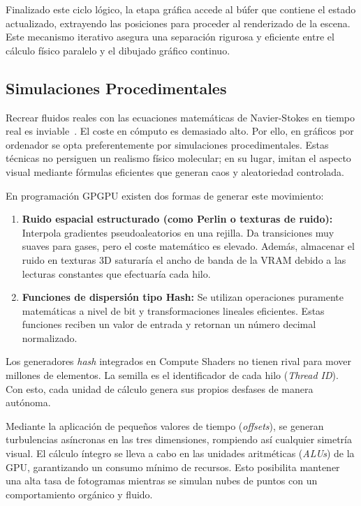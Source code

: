Finalizado este ciclo lógico, la etapa gráfica accede al búfer que contiene el estado actualizado, extrayendo las posiciones para proceder al renderizado de la escena. Este mecanismo iterativo asegura una separación rigurosa y eficiente entre el cálculo físico paralelo y el dibujado gráfico continuo.


\subsection{Simulaciones Procedimentales}

Recrear fluidos reales con las ecuaciones matemáticas de Navier-Stokes en tiempo real es inviable~\parencite{akenine2018real}. 
El coste en cómputo es demasiado alto. Por ello, en gráficos por ordenador se opta preferentemente por simulaciones procedimentales. 
Estas técnicas no persiguen un realismo físico molecular; en su lugar, imitan el aspecto visual mediante fórmulas eficientes que generan caos y aleatoriedad controlada.

\noindent En programación GPGPU existen dos formas de generar este movimiento:

\begin{enumerate}
    \item \textbf{Ruido espacial estructurado (como Perlin o texturas de ruido):} Interpola gradientes pseudoaleatorios en una rejilla. 
    Da transiciones muy suaves para gases, pero el coste matemático es elevado. 
    Además, almacenar el ruido en texturas 3D saturaría el ancho de banda de la VRAM debido a las lecturas constantes que efectuaría cada hilo.
    \item \textbf{Funciones de dispersión tipo Hash:} Se utilizan operaciones puramente matemáticas a nivel de bit y transformaciones lineales eficientes. Estas funciones reciben un valor de entrada y retornan un número decimal normalizado.
\end{enumerate}

Los generadores \textit{hash} integrados en Compute Shaders no tienen rival para mover millones de elementos. 
La semilla es el identificador de cada hilo (\textit{Thread ID}). 
Con esto, cada unidad de cálculo genera sus propios desfases de manera autónoma.

Mediante la aplicación de pequeños valores de tiempo (\textit{offsets}), se generan turbulencias asíncronas en las tres dimensiones, rompiendo así cualquier simetría visual.
El cálculo íntegro se lleva a cabo en las unidades aritméticas (\textit{ALUs}) de la GPU, garantizando un consumo mínimo de recursos. 
Esto posibilita mantener una alta tasa de fotogramas mientras se simulan nubes de puntos con un comportamiento orgánico y fluido.

